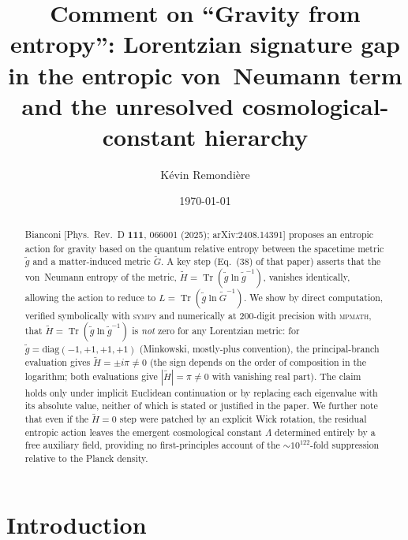 \documentclass[aps,prd,twocolumn,preprintnumbers,superscriptaddress]{revtex4-2}
\newcommand{\tg}{\tilde{g}}
\newcommand{\tG}{\tilde{G}}
\newcommand{\tr}{\operatorname{Tr}}
\newcommand{\iunit}{i}
\begin{document}
\title{Comment on ``Gravity from entropy'': Lorentzian signature gap in the
       entropic von~Neumann term and the unresolved cosmological-constant hierarchy}

\author{Kévin Remondière}

\date{\today}


\begin{abstract}
Bianconi [Phys.\ Rev.\ D \textbf{111}, 066001 (2025); arXiv:2408.14391]
proposes an entropic action for gravity based on the quantum relative entropy
between the spacetime metric $\tg$ and a matter-induced metric $\tG$.
A key step (Eq.~(38) of that paper) asserts that the von~Neumann entropy of
the metric, $\tilde{H} = \tr(\tg\ln\tg^{-1})$, vanishes identically,
allowing the action to reduce to $L = \tr(\tg\ln\tG^{-1})$.
We show by direct computation, verified symbolically with \textsc{sympy}
and numerically at 200-digit precision with \textsc{mpmath}, that
$\tilde{H} = \tr(\tg\ln\tg^{-1})$ is \emph{not} zero for any
Lorentzian metric: for $\tg = \mathrm{diag}(-1,+1,+1,+1)$ (Minkowski,
mostly-plus convention), the principal-branch evaluation gives
$\tilde{H} = \pm\iunit\pi \neq 0$ (the sign depends on
the order of composition in the logarithm; both evaluations give
$|\tilde{H}| = \pi \neq 0$ with vanishing real part).
The claim holds only under implicit Euclidean continuation or by replacing each
eigenvalue with its absolute value, neither of which is stated or justified
in the paper.  We further note that even if the $\tilde{H}=0$ step
were patched by an explicit Wick rotation, the residual entropic action
leaves the emergent cosmological constant $\Lambda$ determined entirely
by a free auxiliary field, providing no first-principles account of the
$\sim\!10^{122}$-fold suppression relative to the Planck density.
\end{abstract}

\maketitle

\section{Introduction}
\label{sec:intro}
\end{document}
